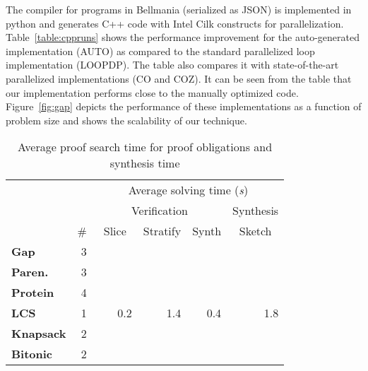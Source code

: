 The compiler for programs in Bellmania (serialized as JSON) is implemented in 
python and generates C++ code with Intel Cilk constructs for parallelization.
Table~\ref{table:cppruns} shows the performance improvement for the auto-generated 
implementation (AUTO) as compared to the standard parallelized loop implementation 
(LOOPDP). The table also compares it with state-of-the-art parallelized 
implementations (CO and COZ). It can be seen from the table that our 
implementation performs close to the manually optimized code. 
Figure~\ref{fig:gap} depicts the performance of these implementations 
as a function of problem size and shows the scalability of our technique. %


\begin{table}
\centering
\renewcommand\a{({\it i})}    %
\renewcommand\b{({\it ii})}
\renewcommand\c{({\it iii})}
\begin{tabular}{|l|r|rrr|r|}
  \cline{2-6}
  \multicolumn{1}{c|}{} &    & \multicolumn{4}{c|}{\small Average solving time ({\it s})}  \\
  \multicolumn{1}{c|}{} &    & \multicolumn{3}{c|}{\small Verification} & {\small Synthesis} \\
  \multicolumn{1}{c|}{} & \# & \multicolumn{1}{c|}{~\sf Slice~} & \multicolumn{1}{c|}{\sf Stratify} & \multicolumn{1}{c|}{\sf Synth} & \multicolumn{1}{c|}{Sketch} \\
  \hline
  {\bf Gap} & 3 &  & \\
  \hline
  {\bf Paren.} & 3 & & \\
  \hline
  {\bf Protein} & 4 & & \\
  \hline
  {\bf LCS} & 1 &  0.2  &  1.4  &  0.4  &  1.8 \\
  \hline
  {\bf Knapsack} & 2 & & \\
  \hline
  {\bf Bitonic} & 2 & & \\
  \hline
\end{tabular}
\caption{\label{evaluation:solving time}
  Average proof search time for proof obligations and synthesis
  time}
\end{table}



\begin{figure}

\end{figure}
